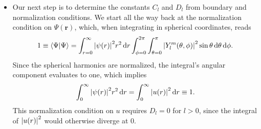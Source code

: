 \documentclass[11pt, a4paper]{article}
\newcommand{\diff}{\mathop{}\!\mathrm{d}} %
\renewcommand{\vec}[1]{\bm{#1}}  %
\renewcommand{\r}{\vec{r}}  %
\newcommand{\p}{\psi}  %
\renewcommand{\P}{\Psi}  %
\begin{document}
\begin{itemize}
	\item Our next step is to determine the constants $ C_{l} $ and $ D_{l} $ from boundary and normalization conditions. We start all the way back at the normalization condition on $ \P(\r) $, which, when integrating in spherical coordinates, reads
	\begin{equation*}
		1 \equiv \braket{\P}{\P} = \int_{r = 0}^{\infty}\abs{\p(r)}^{2}r^{2}\diff r \int_{\phi = 0}^{2\pi}\int_{\theta = 0}^{\pi}\abs{Y_{l}^{m}(\theta, \phi)}^{2}\sin \theta \diff \theta \diff \phi.
	\end{equation*}
	Since the spherical harmonics are normalized, the integral's angular component evaluates to one, which implies
	\begin{equation*}
		\int_{ 0}^{\infty}\abs{\p(r)}^{2}r^{2}\diff r = \int_{0}^{\infty}\abs{u(r)}^{2}\diff r \equiv 1.
	\end{equation*}
	This normalization condition on $ u $ requires $ D_{l} = 0 $ for $ l > 0 $, since the integral of $ \abs{u(r)}^{2} $ would otherwise diverge at $ 0 $. 
	

\end{itemize}
\end{document}
